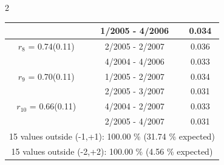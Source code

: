 \begin{multicols}{2}
{\begin{tabular}{ccc}
&        1/2005 -  4/2006 &        0.034  \vspace{-.02in} \\ \hline 
  $r_{ 8}$ = 0.74(0.11) &       2/2005 -  2/2007 &        0.036   \vspace{-.10in} \\  
&        4/2004 -  4/2006 &        0.033  \vspace{-.02in} \\ \hline 
  $r_{ 9}$ = 0.70(0.11) &       1/2005 -  2/2007 &        0.034   \vspace{-.10in} \\  
&        2/2005 -  3/2007 &        0.031  \vspace{-.02in} \\ \hline 
  $r_{10}$ = 0.66(0.11) &       4/2004 -  2/2007 &        0.033   \vspace{-.10in} \\  
&        2/2005 -  4/2007 &        0.031  \vspace{-.02in} \\ \hline 
\multicolumn{3}{c}{              15 values outside (-1,+1): 100.00  \% (31.74  \% expected)}\vspace{-.10in} \\ 
\multicolumn{3}{c}{              15 values outside (-2,+2): 100.00 \%  (4.56 \% expected) } \\
 \end{tabular} \\ 
 } 
\end{multicols} 
